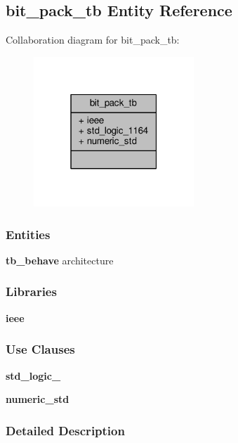 \subsection{bit\+\_\+pack\+\_\+tb Entity Reference}
\label{classbit__pack__tb}


Collaboration diagram for bit\+\_\+pack\+\_\+tb\+:\nopagebreak
\begin{figure}[H]
\begin{center}
\leavevmode
\includegraphics[width=171pt]{d0/d99/classbit__pack__tb__coll__graph}
\end{center}
\end{figure}
\subsubsection*{Entities}
\begin{DoxyCompactItemize}
\item 
{\bf tb\+\_\+behave} architecture
\end{DoxyCompactItemize}
\subsubsection*{Libraries}
 \begin{DoxyCompactItemize}
\item 
{\bf ieee} 
\end{DoxyCompactItemize}
\subsubsection*{Use Clauses}
 \begin{DoxyCompactItemize}
\item 
{\bf std\+\_\+logic\+\_}   
\item 
{\bf numeric\+\_\+std}   
\end{DoxyCompactItemize}


\subsubsection{Detailed Description}


